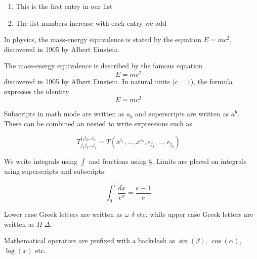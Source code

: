   \begin{enumerate}
    \item This is the first entry in our list
    \item The list numbers increase with each entry we add
  \end{enumerate}


  In physics, the mass-energy equivalence is stated 
  by the equation $E=mc^2$, discovered in 1905 by Albert Einstein.


  The mass-energy equivalence is described by the famous equation
\[ E=mc^2 \]
discovered in 1905 by Albert Einstein. 
In natural units ($c = 1$), the formula expresses the identity
\begin{equation}
E=mc^2
\end{equation}


Subscripts in math mode are written as $a_b$ and superscripts are written as $a^b$. These can be combined an nested to write expressions such as

\[ T^{i_1 i_2 \dots i_p}_{j_1 j_2 \dots j_q} = T(x^{i_1},\dots,x^{i_p},e_{j_1},\dots,e_{j_q}) \]
 
We write integrals using $\int$ and fractions using $\frac{a}{b}$. Limits are placed on integrals using superscripts and subscripts:

\[ \int_0^1 \frac{dx}{e^x} =  \frac{e-1}{e} \]

Lower case Greek letters are written as $\omega$ $\delta$ etc. while upper case Greek letters are written as $\Omega$ $\Delta$.

Mathematical operators are prefixed with a backslash as $\sin(\beta)$, $\cos(\alpha)$, $\log(x)$ etc.
  


